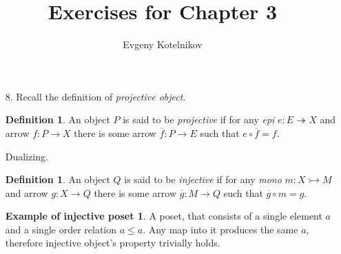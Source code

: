 \documentclass[12pt]{article}
\author{Evgeny Kotelnikov}
\title{Exercises for Chapter 3}
\date{}
\theoremstyle{definition}
\begin{document}
\maketitle

\begin{enumerate}
  \item[8.]
    Recall the definition of \emph{projective object}.
    \newtheorem*{projective}{Definition}
    \begin{projective}
      An object $P$ is said to be \emph{projective} if for any \emph{epi} $e : E \twoheadrightarrow X$ and arrow $f : P \to X$ there is some arrow $\overline{f} : P \to E$ such that $e \circ \overline{f} = f$.
      \begin{figure}[H]
        \centering
      \end{figure}
    \end{projective}
    
    Dualizing.
    
    \newtheorem*{injective}{Definition}
    \begin{injective}
      An object $Q$ is said to be \emph{injective} if for any \emph{mono} $m : X \rightarrowtail M$ and arrow $g : X \to Q$ there is some arrow $\overline{g} : M \to Q$ such that $\overline{g} \circ m = g$.
      \begin{figure}[H]
        \centering
      \end{figure}
    \end{injective}

    \newtheorem*{injective-poset}{Example of injective poset}
    \begin{injective-poset}
      A poset, that consists of a single element $a$ and a single order relation $a \leq a $. Any map into it produces the same $a$, therefore injective object's property trivially holds. 
    \end{injective-poset}


\end{enumerate}
\end{document}
